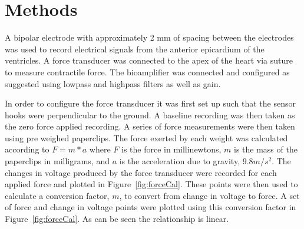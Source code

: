 \documentclass[12pt]{article}
\begin{document}
\section{Methods}

\par{}
A bipolar electrode with approximately 2 mm of spacing between the electrodes was used to record electrical signals from the anterior epicardium of the ventricles. A force transducer was connected to the apex of the heart via suture to measure contractile force. The bioamplifier was connected and configured as suggested using lowpass and highpass filters as well as gain.

\par{}
In order to configure the force transducer it was first set up such that the sensor hooks were perpendicular to the ground. A baseline recording was then taken as the zero force applied recording. A series of force measurements were then taken using pre weighed paperclips. The force exerted by each weight was calculated according to $F = m*a$ where $F$ is the force in millinewtons, $m$ is the mass of the paperclips in milligrams, and $a$ is the acceleration due to gravity, $9.8 m/s^2$. The changes in voltage produced by the force transducer were recorded for each applied force and plotted in Figure~\ref{fig:forceCal}. These points were then used to calculate a conversion factor, $m$, to convert from change in voltage to force. A set of force and change in voltage points were plotted using this conversion factor in Figure~\ref{fig:forceCal}. As can be seen the relationship is linear.
\end{document}
